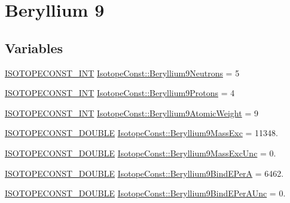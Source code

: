 \hypertarget{group___isotope_const-_beryllium-_be9}{}\section{Beryllium 9}
\label{group___isotope_const-_beryllium-_be9}
\subsection*{Variables}
\begin{DoxyCompactItemize}
\item 
\mbox{\hyperlink{group___isotope_const-_macros_ga5f18360b3e99483a35c32d789e62621c}{I\+S\+O\+T\+O\+P\+E\+C\+O\+N\+S\+T\+\_\+\+I\+NT}} \mbox{\hyperlink{group___isotope_const-_beryllium-_be9_gad24d22e80b6f814d52c31407982efc5c}{Isotope\+Const\+::\+Beryllium9\+Neutrons}} = 5
\item 
\mbox{\hyperlink{group___isotope_const-_macros_ga5f18360b3e99483a35c32d789e62621c}{I\+S\+O\+T\+O\+P\+E\+C\+O\+N\+S\+T\+\_\+\+I\+NT}} \mbox{\hyperlink{group___isotope_const-_beryllium-_be9_ga2376597d45877e13d1c6aeefcbce5c61}{Isotope\+Const\+::\+Beryllium9\+Protons}} = 4
\item 
\mbox{\hyperlink{group___isotope_const-_macros_ga5f18360b3e99483a35c32d789e62621c}{I\+S\+O\+T\+O\+P\+E\+C\+O\+N\+S\+T\+\_\+\+I\+NT}} \mbox{\hyperlink{group___isotope_const-_beryllium-_be9_ga14128c7a98f1919b2d3f6c7aa07b8061}{Isotope\+Const\+::\+Beryllium9\+Atomic\+Weight}} = 9
\item 
\mbox{\hyperlink{group___isotope_const-_macros_ga8f45a7272ce02c0b4c65c44636ed719a}{I\+S\+O\+T\+O\+P\+E\+C\+O\+N\+S\+T\+\_\+\+D\+O\+U\+B\+LE}} \mbox{\hyperlink{group___isotope_const-_beryllium-_be9_gab692f04996cd748b079fd72b50cf481e}{Isotope\+Const\+::\+Beryllium9\+Mass\+Exc}} = 11348.
\item 
\mbox{\hyperlink{group___isotope_const-_macros_ga8f45a7272ce02c0b4c65c44636ed719a}{I\+S\+O\+T\+O\+P\+E\+C\+O\+N\+S\+T\+\_\+\+D\+O\+U\+B\+LE}} \mbox{\hyperlink{group___isotope_const-_beryllium-_be9_ga1754c62404311e4a28d58805ebc6557d}{Isotope\+Const\+::\+Beryllium9\+Mass\+Exc\+Unc}} = 0.
\item 
\mbox{\hyperlink{group___isotope_const-_macros_ga8f45a7272ce02c0b4c65c44636ed719a}{I\+S\+O\+T\+O\+P\+E\+C\+O\+N\+S\+T\+\_\+\+D\+O\+U\+B\+LE}} \mbox{\hyperlink{group___isotope_const-_beryllium-_be9_ga55d48f827a7fc2dd26a8ef0d11f4fc16}{Isotope\+Const\+::\+Beryllium9\+Bind\+E\+PerA}} = 6462.
\item 
\mbox{\hyperlink{group___isotope_const-_macros_ga8f45a7272ce02c0b4c65c44636ed719a}{I\+S\+O\+T\+O\+P\+E\+C\+O\+N\+S\+T\+\_\+\+D\+O\+U\+B\+LE}} \mbox{\hyperlink{group___isotope_const-_beryllium-_be9_ga2c20c10bc6993d97b271501d73731afb}{Isotope\+Const\+::\+Beryllium9\+Bind\+E\+Per\+A\+Unc}} = 0.

\end{DoxyCompactItemize}
